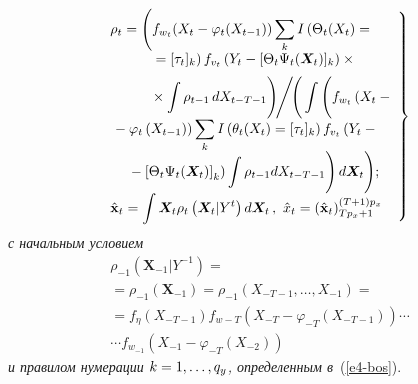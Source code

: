 \begin{multicols}{2}
\noindent
     \begin{equation}
     \left.
    \hspace*{-2mm} \begin{array}{l}
     \rho_t= \Bigg( f_{w_t}(X_t-\varphi_t(X_{t-1}))  \displaystyle\sum\limits_k I 
\left(\Theta_t(X_t)={}\right.\\[6pt]
\hspace*{10mm}\left.{}= [\tau_t]_k\right) f_{v_t} \left(Y_t - [\Theta_t\Psi_t(\bm{X}_t)]_k\right)\times{}\\[6pt]
\hspace*{10mm}{}\times \displaystyle\int \rho_{t-1} \,dX_{t-T-1} \Bigg) \!\Bigg/  \!
\Bigg( \int \Bigg( f_{w_t} 
\left(X_t -{}\right.\\[6pt]
\left.{}-\varphi_t\left(X_{t-1}\right)\right) \displaystyle \sum\limits_k I \left(\theta_t(X_t) =[\tau_t]_k\right) f_{v_t} 
\left(Y_t -{}\right.\\[6pt]
\hspace*{4mm}\left.{}-\left[\Theta_t \Psi_t (\bm{X}_t)\right]_k \right)\displaystyle\int \rho_{t-1} dX_{t-T-1}\Bigg) \,d\bm{X}_t
\Bigg);
\\[6pt]
     \hat{\mathbf{x}}_t= \displaystyle \int \bm{X}_t \rho_t \left( \bm{X}_t\vert 
Y^t\right) d\bm{X}_t\,,\ \hat{x}_t=\left( 
\hat{\mathbf{x}}_t\right)_{Tp_x+1}^{(T+1)p_x}
     \end{array}
\!\!     \right\}
     \label{e5-bos}
     \end{equation}
\textit{с начальным условием}
\begin{multline*}
\rho_{-1} \left( \bm{X}_{-1}\vert Y^{-1}\right) ={}\\
{}=\rho_{-1}\left( \bm{X}_{-1}\right) 
=\rho_{-1} \left( X_{-T-1}, \ldots , X_{-1}\right)={}\\
{}= f_\eta \left( X_{-T-1}\right) f_{w-T}\left( X_{-T} -\varphi_{-T} \left( X_{-T-1}\right)\right) \cdots\\
\cdots f_{w_{-1}} \left( X_{-1} -\varphi_{-T}\left( X_{-2}\right)\right)
\end{multline*}
\textit{и правилом нумерации $k\hm= 1,\ldots , q_y$, определенным  в}~(\ref{e4-bos}).

\smallskip


\end{multicols}
